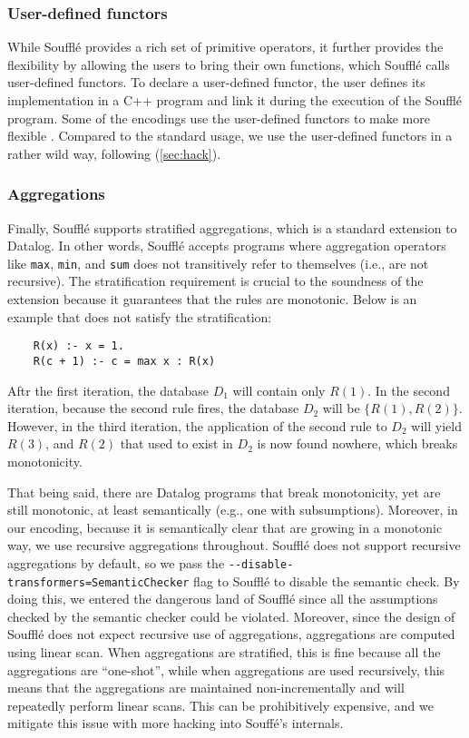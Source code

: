 \subsubsection*{User-defined functors}
While Souffl\'e provides a rich set of primitive operators,
 it further provides the flexibility by allowing the users
 to bring their own functions, which Souffl\'e calls
 user-defined functors.
To declare a user-defined functor, 
 the user defines its implementation in a C++ program and
 link it during the execution of the Souffl\'e program.
Some of the encodings use the user-defined functors 
 to make \eqrel{} more flexible \citep{zucker-udf-1,zucker-udf-2}.
Compared to the standard usage, 
 we use the user-defined functors in a rather wild way, 
 following \citep{zucker-udf-1} (\autoref{sec:hack}).

\subsubsection*{Aggregations}
Finally, Souffl\'e supports stratified aggregations, 
 which is a standard extension to Datalog.
In other words, 
 Souffl\'e accepts programs where 
 aggregation operators like \texttt{max}, \texttt{min}, and \texttt{sum}
 does not transitively refer to themselves (i.e., are not recursive).
The stratification requirement is crucial to the soundness of the extension
 because it guarantees that the rules are monotonic.
Below is an example that does not satisfy the stratification:
\begin{verbatim}
    R(x) :- x = 1.
    R(c + 1) :- c = max x : R(x)
\end{verbatim}
Aftr the first iteration, the database $D_1$ will contain only $R(1)$. 
In the second iteration, because the second rule fires,
 the database $D_2$ will be $\{R(1), R(2)\}$.
However, in the third iteration,
 the application of the second rule to $D_2$ will yield
 $R(3)$, and $R(2)$ that used to exist in $D_2$ is now found nowhere,
 which breaks monotonicity.

That being said, there are Datalog programs that break monotonicity,
 yet are still monotonic, at least semantically (e.g., one with subsumptions).
Moreover, in our encoding, because it is semantically clear that 
 \egraphs are growing in a monotonic way, we use recursive aggregations 
 throughout.
Souffl\'e does not support recursive aggregations by default,
 so we pass the \verb|--disable-transformers=SemanticChecker|
 flag to Souffl\'e to disable the semantic check.
By doing this, 
 we entered the dangerous land of Souffl\'e 
 since all the assumptions checked by the semantic checker
 could be violated.
Moreover,
 since the design of Souffl\'e does not expect
 recursive use of aggregations,
 aggregations are computed using linear scan.
When aggregations are stratified,
 this is fine because all the aggregations are ``one-shot'',
 while when aggregations are used recursively, 
 this means that the aggregations
 are maintained non-incrementally 
 and will repeatedly perform linear scans.
This can be prohibitively expensive, 
 and we mitigate this issue with more hacking into Souff\'e's internals.

